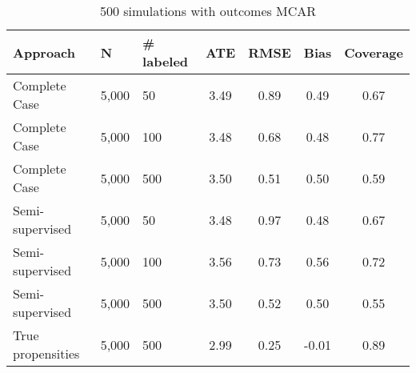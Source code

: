 \begin{table}[ht]
\centering
\begingroup\small
\begin{tabular}{lllcccc}
  \hline
Approach & N & \# labeled & ATE & RMSE & Bias & Coverage \\ 
  \hline
  Complete Case & 5,000 &  50 & 3.49 & 0.89 & 0.49 & 0.67 \\ 
  Complete Case & 5,000 & 100 & 3.48 & 0.68 & 0.48 & 0.77 \\ 
  Complete Case & 5,000 & 500 & 3.50 & 0.51 & 0.50 & 0.59 \\ 
  Semi-supervised & 5,000 &  50 & 3.48 & 0.97 & 0.48 & 0.67 \\ 
  Semi-supervised & 5,000 & 100 & 3.56 & 0.73 & 0.56 & 0.72 \\ 
  Semi-supervised & 5,000 & 500 & 3.50 & 0.52 & 0.50 & 0.55 \\ 
  True propensities & 5,000 & 500 & 2.99 & 0.25 & -0.01 & 0.89 \\ 
   \hline
\end{tabular}
\endgroup
\caption{500 simulations with outcomes MCAR} 
\end{table}
